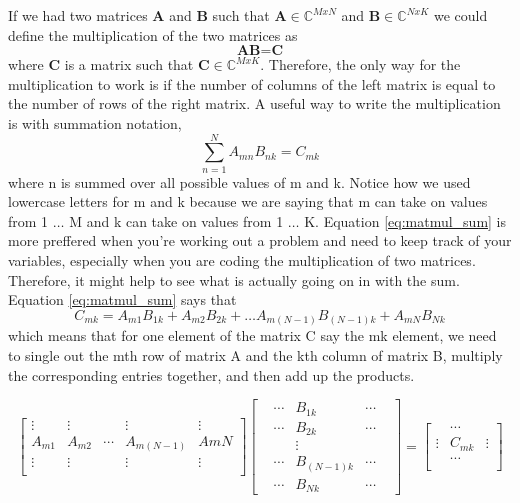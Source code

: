 \documentclass{article}
\newcommand{\be}{\begin{equation}}
\newcommand{\ee}{\end{equation}}
\begin{document}
If we had two matrices \textbf{A} and \textbf{B} such that $\textbf{A} \in \mathbb{C}^{MxN}$ and $\textbf{B} \in \mathbb{C}^{NxK}$ we could define the multiplication of the two matrices as
\be \label{eq:matmul}
  \textbf{A} \textbf{B} = \textbf{C}
\ee
where \textbf{C} is a matrix such that $\textbf{C} \in \mathbb{C}^{MxK}$.
Therefore, the only way for the multiplication to work is if the number of columns of the left matrix is equal to the number of rows of the right matrix.
A useful way to write the multiplication is with summation notation,
\be \label{eq:matmul_sum}
  \sum\limits_{n=1}^{N} A_{mn} B_{nk} = C_{mk}
\ee
where n is summed over all possible values of m and k.
Notice how we used lowercase letters for m and k because we are saying that m can take on values from 1 $\hdots$ M and k can take on values from 1 $\hdots$ K.
Equation \ref{eq:matmul_sum} is more preffered when you're working out a problem and need to keep track of your variables, especially when you are coding the multiplication of two matrices.
Therefore, it might help to see what is actually going on in with the sum.
Equation \ref{eq:matmul_sum} says that
\be
  C_{mk} = A_{m1} B_{1k} + A_{m2} B_{2k} + \hdots A_{m(N-1)} B_{(N-1)k} + A_{mN} B_{Nk}
\ee
which means that for one element of the matrix C say the mk element, we need to single out the mth row of matrix A and the kth column of matrix B, multiply the corresponding entries together, and then add up the products.

\[
\begin{bmatrix}
  \vdots & \vdots & & \vdots & \vdots \\
  A_{m1} & A_{m2} & \cdots & A_{m(N-1)} & A{mN} \\
  \vdots & \vdots & & \vdots & \vdots \\
\end{bmatrix}
\begin{bmatrix}
  & \cdots & B_{1k} & \cdots & \\
  & \cdots & B_{2k} & \cdots & \\
  & & \vdots & & \\
  & \cdots & B_{(N-1)k} & \cdots & \\
  & \cdots & B_{Nk} & \cdots &
\end{bmatrix}
=
\begin{bmatrix}
   & \cdots & \\
  \vdots & C_{mk} & \vdots \\
   & \cdots & \\
\end{bmatrix}
\]
\end{document}
